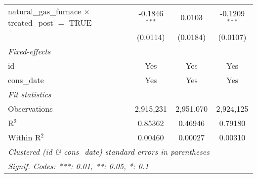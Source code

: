 \begin{tabular}{lccc}
   natural\_gas\_furnace $\times$ treated\_post $=$ TRUE     & -0.1846$^{***}$ & 0.0103         & -0.1209$^{***}$\\   
                                                             & (0.0114)        & (0.0184)       & (0.0107)\\   
   \midrule
   \emph{Fixed-effects}\\
   id                                                        & Yes             & Yes            & Yes\\  
   cons\_date                                                & Yes             & Yes            & Yes\\  
   \midrule
   \emph{Fit statistics}\\
   Observations                                              & 2,915,231       & 2,951,070      & 2,924,125\\  
   R$^2$                                                     & 0.85362         & 0.46946        & 0.79180\\  
   Within R$^2$                                              & 0.00460         & 0.00027        & 0.00310\\  
   \midrule \midrule
   \multicolumn{4}{l}{\emph{Clustered (id \& cons\_date) standard-errors in parentheses}}\\
   \multicolumn{4}{l}{\emph{Signif. Codes: ***: 0.01, **: 0.05, *: 0.1}}\\
\end{tabular}
\par\endgroup



